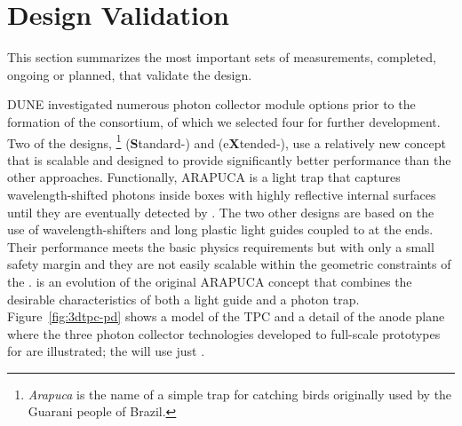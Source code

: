 \section{Design Validation}
\label{sec:fdsp-pd-validation}


This section summarizes the most important sets of measurements, completed, ongoing or planned, that validate the  design.


DUNE investigated numerous  photon collector module options prior to the formation of the \single {} consortium, of which we selected four for further development. 
Two of the designs, \footnote{\textit{Arapuca} is the name of a simple trap for catching birds originally used by the Guarani people of Brazil.} (\textbf{S}tandard-) and  (e\textbf{X}tended-), use a relatively new concept that is scalable and designed to provide  
significantly better performance than the other approaches. Functionally, ARAPUCA is a light trap that captures wavelength-shifted photons inside boxes with highly reflective internal surfaces until they are eventually detected by .  The two other designs are based on the use of wavelength-shifters and long plastic light guides coupled to  at the ends. Their performance meets the basic physics requirements but with only a small safety margin and they are not easily scalable within the geometric constraints of the .  is an evolution of the original ARAPUCA concept that combines the desirable characteristics of both a light guide and a photon trap. 
Figure~\ref{fig:3dtpc-pd} shows a \threed model of the \single TPC and a detail of the anode plane where the three photon collector technologies developed to full-scale prototypes for  are illustrated; 
the  will use just .

